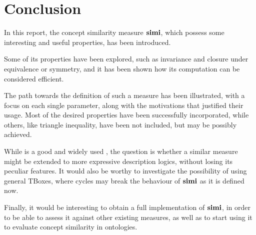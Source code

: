   \section{Conclusion}

  In this report, the concept similarity measure \(\operatorname{\mathbf{simi}}\), which possess some interesting and useful properties, has been introduced.

  Some of its properties have been explored, such as invariance and closure under equivalence or symmetry, and it has been shown how its computation can be considered efficient.

  The path towards the definition of such a measure has been illustrated, with a focus on each single parameter, along with the motivations that justified their usage.
  Most of the desired properties have been successfully incorporated, while others, like triangle inequality, have been not included, but may be possibly achieved.

  While \elh is a good and widely used \dl, the question is whether a similar measure might be extended to more expressive description logics, without losing its peculiar features.
  It would also be worthy to investigate the possibility of using general TBoxes, where cycles may break the behaviour of \(\operatorname{\mathbf{simi}}\) as it is defined now.

  Finally, it would be interesting to obtain a full implementation of \(\operatorname{\mathbf{simi}}\), in order to be able to assess it against other existing measures, as well as to start using it to evaluate concept similarity in ontologies.
